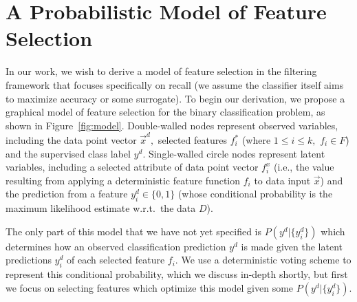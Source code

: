 \section{A Probabilistic Model of Feature Selection}

%


In our work, we wish to derive a model of feature selection in the
filtering framework that focuses specifically on recall (we assume the
classifier itself aims to maximize accuracy or some surrogate).  To
begin our derivation, we propose a graphical model of feature
selection for the binary classification problem, as shown in
Figure~\ref{fig:model}. Double-walled nodes represent observed
variables, including the data point vector $\vec{x}^{d},$ selected
features $f_i^*$ (where $1\leq i\leq k,$ $f_i\in F$) and the
supervised class label $y^d$. Single-walled circle nodes represent
latent variables, including a selected attribute of data
point vector $f_i^x$ (i.e., the value resulting from applying
a deterministic feature function $f_i$ to data input $\vec{x}$) and
the prediction from a feature $y^d_i \in \{0,1\}$ (whose conditional
probability is the maximum likelihood estimate w.r.t.\ the data $D$).

The only part of this model that we have not yet specified is 
$P(y^d|\{y^d_i\})$ which determines how an observed classification 
prediction $y^d$ is made given the latent predictions $y^d_i$ of each 
selected feature $f_i$.  We use a deterministic voting scheme
to represent this conditional probability, which we discuss
in-depth shortly, but first we focus on selecting features which optimize
this model given some $P(y^d|\{y^d_i\})$.

